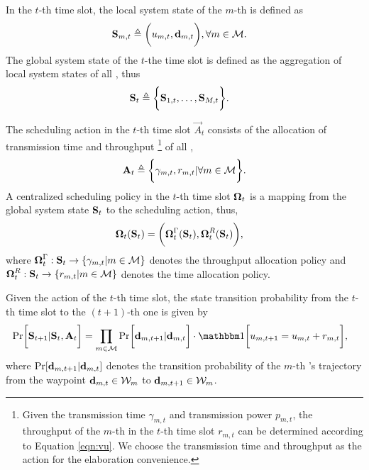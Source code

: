 \begin{definition}
    \label{def:mdp}
    In the $t$-th time slot, the local system state of the $m$-th {\IAV} is defined as
    \begin{align}
        \mathbf{S}_{m,t} &\triangleq \bigg( u_{m,t}, \mathbf{d}_{m,t} \bigg), \forall m\in\mathcal{M}.
    \end{align}
    The global system state of the $t$-the time slot is defined as the aggregation of local system states of all {\IAVs}, thus
    \begin{align}
        \mathbf{S}_t &\triangleq \bigg\{ \mathbf{S}_{1,t}, \dots, \mathbf{S}_{M,t} \bigg\}.
    \end{align}

    The scheduling action in the $t$-th time slot $\vec{A}_{t}$ consists of the allocation of transmission time and throughput%
    \footnote{
        Given the transmission time $\gamma_{m,t}$ and transmission power $p_{m,t}$,
        the throughput of the $m$-th {\IAV} in the $t$-th time slot $r_{m,t}$ can be determined according to Equation \eqref{eqn:vu}.
        We choose the transmission time and throughput as the action for the elaboration convenience.
    }
    of all {\IAVs},
    \begin{align}
        \mathbf{A}_{t} \triangleq \bigg\{ \gamma_{m,t}, r_{m,t} | \forall m\in\mathcal{M} \bigg\}.
    \end{align}
    A centralized scheduling policy in the $t$-th time slot $\boldsymbol{\Omega}_{t}$ is a mapping from the global system state $\mathbf{S}_{t}$ to the scheduling action, thus,
    \begin{align}
        \boldsymbol{\Omega}_{t}(\mathbf{S}_t) &= \bigg( \boldsymbol{\Omega}^{\Gamma}_{t}(\mathbf{S}_t), \boldsymbol{\Omega}^{R}_{t}(\mathbf{S}_t) \bigg),
    \end{align}
    where $\boldsymbol{\Omega}^{\Gamma}_{t}: \mathbf{S}_{t} \to \{\gamma_{m,t} | m\in\mathcal{M}\}$ denotes the throughput allocation policy and $\boldsymbol{\Omega}^{R}_{t}: \mathbf{S}_{t} \to \{r_{m,t} | m\in\mathcal{M}\}$ denotes the time allocation policy.
\end{definition}

Given the action of the $t$-th time slot, the state transition probability from the $t$-th time slot to the $(t+1)$-th one is given by
\begin{align}
    &\Pr\Bracket{ \Stat_{t+1} | \Stat_{t}, \vec{A}_{t} } =
        \prod_{m\in\carSet} \Pr\Bracket{ \vec{d}_{m,t+1} | \vec{d}_{m,t} }
        \cdot \indicator\Bracket{ u_{m,t+1}=u_{m,t}+r_{m,t} },
    \label{eqn:trans_prob}
\end{align}
where $\Pr[ \mathbf{d}_{m,t+1} | \mathbf{d}_{m,t} ]$ denotes the transition probability of the $m$-th {\IAV}'s trajectory from the waypoint $\mathbf{d}_{m,t}  \in \mathcal{W}_{m}$ to $\mathbf{d}_{m,t+1} \in \mathcal{W}_{m}$.

